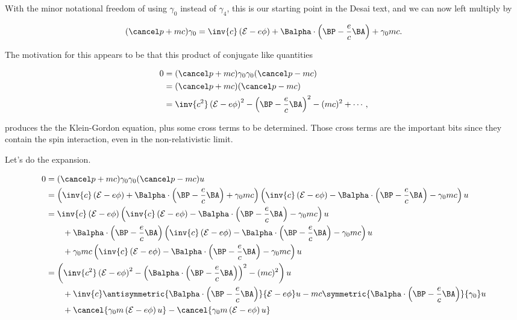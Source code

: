With the minor notational freedom of using $\gamma_0$ instead of $\gamma_4$, this is our starting point in the Desai text, and we can now left multiply by

\begin{equation}\label{eqn:diracGauge:n}
(\pslash + m c) \gamma_0 = 
\inv{c} \left( \mathcal{E} - e \phi \right) 
+\Balpha \cdot \left(\BP - \frac{e}{c} \BA \right) 
+ \gamma_0 m c.
\end{equation}

The motivation for this appears to be that this product of conjugate like quantities

\begin{equation}\label{eqn:diracGauge:n}
\begin{aligned}
0 &= (\pslash + m c) \gamma_0 \gamma_0 (\pslash - m c)  \\
&=
(\pslash + m c) (\pslash - m c) \\
&= \inv{c^2} \left( \mathcal{E} - e \phi \right)^2
 -\left( \BP - \frac{e}{c} \BA \right)^2 - (m c)^2 + \cdots,
\end{aligned}
\end{equation}

produces the the Klein-Gordon equation, plus some cross terms to be determined.  Those cross terms are the important bits since they contain the spin interaction, even in the non-relativistic limit.

Let's do the expansion.

\begin{align*}
0 
&= (\pslash + m c) \gamma_0 \gamma_0 (\pslash - m c) u \\
&=
\left(
\inv{c} \left( \mathcal{E} - e \phi \right) 
+\Balpha \cdot \left(\BP - \frac{e}{c} \BA \right) 
+ \gamma_0 m c
\right)
\left(
\inv{c} \left( \mathcal{E}- e \phi \right) 
-\Balpha \cdot \left(\BP - \frac{e}{c} \BA \right) 
- \gamma_0 m c \right) u \\
&=
\inv{c} \left( \mathcal{E} - e \phi \right) 
\left(
\inv{c} \left( \mathcal{E}- e \phi \right) 
-\Balpha \cdot \left(\BP - \frac{e}{c} \BA \right) 
- \gamma_0 m c \right) u \\
&\qquad +\Balpha \cdot \left(\BP - \frac{e}{c} \BA \right) 
\left(
\inv{c} \left( \mathcal{E}- e \phi \right) 
-\Balpha \cdot \left(\BP - \frac{e}{c} \BA \right) 
- \gamma_0 m c \right) u \\
&\qquad + \gamma_0 m c
\left(
\inv{c} \left( \mathcal{E}- e \phi \right) 
-\Balpha \cdot \left(\BP - \frac{e}{c} \BA \right) 
- \gamma_0 m c \right) u \\
&=
\left(
\inv{c^2} \left( \mathcal{E} - e \phi \right)^2
- \left( \Balpha \cdot \left(\BP - \frac{e}{c} \BA \right) \right)^2
- (mc)^2 
\right) u
\\
&\qquad + \inv{c} \antisymmetric{
\Balpha \cdot \left(\BP - \frac{e}{c} \BA \right) 
}
{
\mathcal{E} - e \phi 
} u
- m c 
\symmetric{\Balpha \cdot \left(\BP - \frac{e}{c} \BA \right)}{ \gamma_0} u \\
&\qquad + \cancel{\gamma_0 m 
\left(
\mathcal{E} - e \phi 
\right) u
}
- \cancel{
\gamma_0 m 
\left(
\mathcal{E} - e \phi 
\right) u
}
\\
\end{align*}

